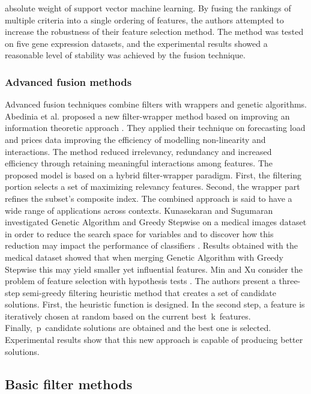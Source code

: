 \documentclass[review]{elsarticle}
\begin{document}
absolute weight of support vector machine learning. By fusing the rankings of multiple criteria into a single ordering of features, the authors attempted to increase the robustness of their feature selection method. The method was tested on five gene expression datasets, and the experimental results showed a reasonable level of stability was achieved by the fusion technique.  

\subsubsection{Advanced fusion methods}

Advanced fusion techniques combine filters with wrappers and genetic algorithms. Abedinia et al. proposed a new filter-wrapper method based on improving an information theoretic approach \cite{Abedinia2017}. They applied their technique on forecasting load and prices data improving the efficiency of modelling non-linearity and interactions. The method reduced irrelevancy, redundancy and increased efficiency through retaining meaningful interactions among features. The proposed model is based on a hybrid filter-wrapper paradigm. First, the filtering portion selects a set of maximizing relevancy features. Second, the wrapper part refines the subset's composite index. The combined approach is said to have a wide range of applications across contexts. Kunasekaran and Sugumaran  investigated Genetic Algorithm and Greedy Stepwise on a medical images dataset in order to reduce the search space for variables and to discover how this reduction may impact the performance of classifiers \cite{Kunasekaran2016}. Results obtained with the medical dataset showed that when merging Genetic Algorithm with Greedy Stepwise this may yield smaller yet influential features. Min and Xu consider the problem of feature selection with hypothesis tests \cite{Min2016}. The authors present a three-step semi-greedy filtering heuristic method that creates a set of candidate solutions. First, the heuristic function is designed. In the second step, a feature is iteratively chosen at random based on the current best k features. Finally, p candidate solutions are obtained and the best one is selected. Experimental results show that this new approach is capable of producing better solutions.

\subsection{Basic filter methods}
\end{document}
